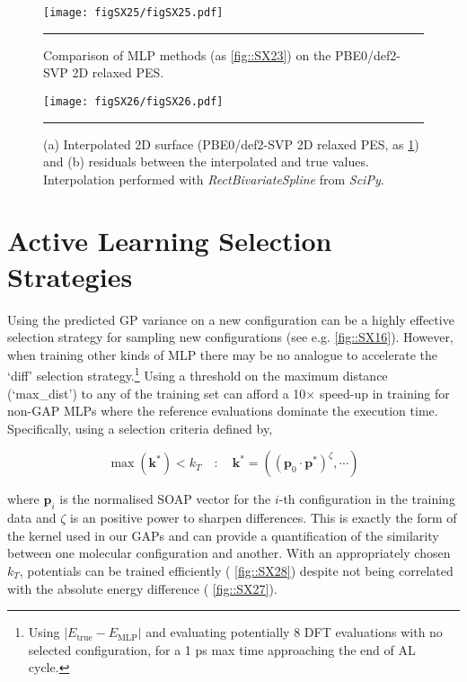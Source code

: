 \documentclass[11pt]{article}
\numberwithin{equation}{subsection}
\begin{document}
\begin{figure}[h!]
	\centering
	\texttt{[image: figSX25/figSX25.pdf]}
	\vspace{0.2cm}
	\hrule
	\vspace{0.1cm}
	\caption{Comparison of MLP methods (as \figurename{ \ref{fig::SX23}}) on the PBE0/def2-SVP 2D relaxed PES.}
	\label{fig::SX25}
\end{figure}


\begin{figure}[h!]
	\centering
	\texttt{[image: figSX26/figSX26.pdf]}
	\vspace{0.2cm}
	\hrule
	\vspace{0.1cm}
	\caption{(a) Interpolated 2D surface (PBE0/def2-SVP 2D relaxed PES, as \figurename{ \ref{fig::SX25}}) and (b) residuals between the interpolated and true values. Interpolation performed with \emph{RectBivariateSpline} from \emph{SciPy}.}
	\label{fig::SX26}
\end{figure}



\clearpage
\section{Active Learning Selection Strategies}


Using the predicted GP variance on a new configuration can be a highly effective selection strategy for sampling new configurations (see e.g. \figurename{ \ref{fig::SX16}}). However, when training other kinds of MLP there may be no analogue to accelerate the `diff' selection strategy.\footnote{Using $|E_\text{true} - E_\text{MLP}|$ and evaluating potentially 8 DFT evaluations with no selected configuration, for a 1 ps max time approaching the end of AL cycle.} Using a threshold on the maximum distance (`max\_dist') to any of the training set can afford a 10$\times$ speed-up in training for non-GAP MLPs where the reference evaluations dominate the execution time. Specifically, using a selection criteria defined by,

\begin{equation}
	\max(\boldsymbol{k}^*) < k_T \quad : \quad \boldsymbol{k}^* = ((\boldsymbol{p}_0 \cdot \boldsymbol{p}^*)^\zeta, \cdots)
\end{equation}

where $\boldsymbol{p}_i$ is the normalised SOAP vector for the $i$-th configuration in the training data and $\zeta$ is an positive power to sharpen differences. This is exactly the form of the kernel used in our GAPs and can provide a quantification of the similarity between one molecular configuration and another. With an appropriately chosen $k_T$, potentials can be trained efficiently (\figurename{ \ref{fig::SX28}}) despite not being correlated with the absolute energy difference (\figurename{ \ref{fig::SX27}}). 
\end{document}

